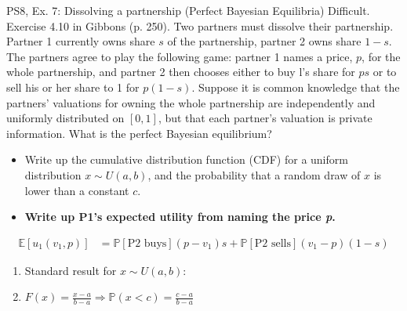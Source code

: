 \begin{frame}{PS8, Ex. 7: Dissolving a partnership (Perfect Bayesian Equilibria)}
    Difficult. Exercise 4.10 in Gibbons (p. 250). Two partners must dissolve their partnership. Partner 1 currently owns share $s$ of the partnership, partner 2 owns share $1-s$. The partners agree to play the following game: partner 1 names a price, $p$, for the whole partnership, and partner 2 then chooses either to buy l's share for $ps$ or to sell his or her share to 1 for $p(1-s)$. Suppose it is common knowledge that the partners' valuations for owning the whole partnership are independently and uniformly distributed on $[0,1]$, but that each partner's valuation is private information. What is the perfect Bayesian equilibrium?\vspace{-8pt}
    \begin{multicols}{2}
      \begin{itemize}
        \item[Step 1:] Write up the cumulative distribution function (CDF) for a uniform distribution $x\sim U(a, b)$, and the probability that a random draw of $x$ is lower than a constant $c$.
        \item[Step 2:] \textbf{Write up P1's expected utility from naming the price \textit{p}.}
      \end{itemize} \vspace{-8pt}
      \begin{align*}
          \mathbb{E}[u_1(v_1,p)]
            &=\mathbb{P}[\text{P2 buys}](p-v_1)s+\mathbb{P}[\text{P2 sells}](v_1-p)(1-s)
      \end{align*}
      \vfill\null\columnbreak
      \begin{enumerate}
        \item Standard result for $x\sim U(a, b):$
        \item[CDF:] $F(x)=\frac{x-a}{b-a}\Rightarrow\mathbb{P}(x<c)=\frac{c-a}{b-a}$
      \end{enumerate}
      \vfill\null
    \end{multicols}
\end{frame}
